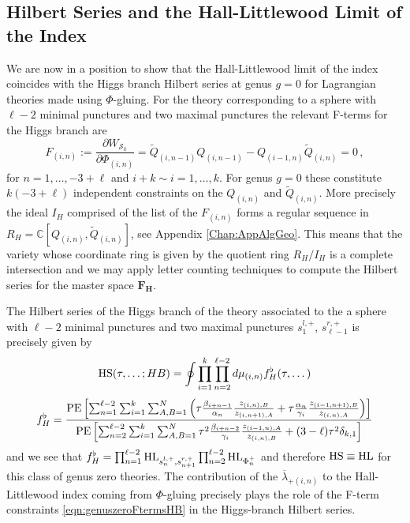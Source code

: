 \documentclass[main.tex]{subfiles}
\begin{document}
\subsection{Hilbert Series and the Hall-Littlewood Limit of the Index}\label{sec:HLeqHS}
We are now in a position to show that the Hall-Littlewood limit of the index coincides with the Higgs branch Hilbert series at genus $g=0$ for Lagrangian theories made using $\Phi$-gluing. For the theory corresponding to a sphere with $\ell-2$ minimal punctures and two maximal punctures the relevant F-terms for the Higgs branch are 
\begin{equation}\label{eqn:genuszeroFtermsHB}
F_{(i,n)}:=\frac{\partial W_{\mathcal{S}_k}}{\partial \Phi_{(i,n)}}= \widetilde{Q}_{(i,n-1)}Q_{(i,n-1)}-Q_{(i-1,n)}\widetilde{Q}_{(i,n)}=0\,,
\end{equation}
for $n=1,\dots,-3+\ell$ and $i+k\sim i=1,\dots, k$.
For genus $g=0$ these constitute $k(-3+\ell)$ independent constraints on the $Q_{(i,n)}$ and $\widetilde{Q}_{(i,n)}$. More precisely the ideal $I_H$ comprised of the list of the $F_{(i,n)}$ forms a regular sequence in $R_H=\mathbb{C}[Q_{(i,n)},\widetilde{Q}_{(i,n)}]$, see Appendix \ref{Chap:AppAlgGeo}. This means that the variety whose coordinate ring is given by the quotient ring $R_H/I_H$ is a complete intersection and we may apply letter counting techniques to compute the Hilbert series for the master space $\mathbf{F_H}$. 

The Hilbert series of the Higgs branch of the theory associated to the a sphere with $\ell-2$ minimal punctures and two maximal punctures $s_{1}^{l,+}$, $s_{\ell-1}^{r,+}$ is precisely given by
\begin{equation}\label{eqn:HSgenericgzero}
\textrm{HS}(\tau,\dots;HB)= \oint\prod_{i=1}^k\prod_{n=2}^{\ell-2} d\mu_{(i,n)}f_H^{\flat}(\tau,\dots)
\end{equation}
\begin{equation}
f_H^{\flat}=\frac{\operatorname{\mathrm{PE}}\left[\sum_{n=1}^{\ell-2}\sum_{i=1}^k\sum_{A,B=1}^N\left(\tau\frac{\beta_{i+n-1}}{\alpha_n}\frac{z_{(i,n),B}}{z_{(i,n+1),A}}+\tau\frac{\alpha_n}{\gamma_i}\frac{z_{(i-1,n+1),B}}{z_{(i,n),A}}\right)\right]}{\operatorname{\mathrm{PE}}\left[\sum_{n=2}^{\ell-2}\sum_{i=1}^k\sum_{A,B=1}^N\tau^2\frac{\beta_{i+n-2}}{\gamma_i}\frac{z_{(i-1,n),A}}{z_{(i,n),B}}+(3-\ell)\tau^2\delta_{k,1}\right]}
\end{equation}
and we see that $f_H^{\flat}=\prod_{n=1}^{\ell-2}\textrm{HL}_{s_{n}^{l,+},s_{n+1}^{r,+}}\prod_{n=2}^{\ell-2}\textrm{HL}_{\Phi_n^+}$ and therefore $\textrm{HS}\equiv\textrm{HL}$ for this class of genus zero theories. The contribution of the $\overline{\lambda}_{\dot+(i,n)}$ to the Hall-Littlewood index coming from $\Phi$-gluing  precisely plays the role of the F-term constraints \eqref{eqn:genuszeroFtermsHB} in the Higgs-branch Hilbert series. 
\end{document}
